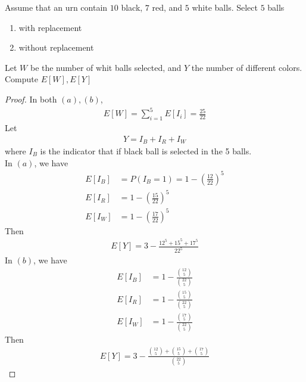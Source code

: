 \documentclass{report}
\begin{document}
\begin{question}{}{}
Assume that an urn contain $10$ black,  $7$ red, and  $5$ white balls. Select  $5$ balls 
 \begin{enumerate}[label=(\alph*)]
  \item with replacement 
  \item without replacement
\end{enumerate}
Let $W$ be the number of whit balls selected, and $Y$ the number of different colors. Compute  $E[W],E[Y]$
\end{question}
\begin{proof}
In both $(a),(b)$, 
\begin{align*}
E[W]=\sum_{i=1}^5 E[I_i]=\frac{25}{22}
\end{align*}
Let 
\begin{align*}
Y=I_B+I_R+I_W
\end{align*}
where $I_B$ is the indicator that if black ball is selected in the 5 balls.\\


In $(a)$, we have 
\begin{align*}
E[I_B]&=P(I_B=1)=1-(\frac{12}{22})^5\\
E[I_R]&=1-(\frac{15}{22})^5\\
E[I_W]&=1-(\frac{17}{22})^5
\end{align*}
Then 
\begin{align*}
E[Y]=3-\frac{12^5+15^5+17^5}{22^5}
\end{align*}
In $(b)$, we have 
\begin{align*}
E[I_B]&=1-\frac{\binom{12}{5}}{\binom{22}{5}}\\
E[I_R]&=1-\frac{\binom{15}{5}}{\binom{22}{5}}\\
E[I_W]&=1-\frac{\binom{17}{5}}{\binom{22}{5}}
\end{align*}
Then 
\begin{align*}
E[Y]=3-\frac{\binom{12}{5}+\binom{15}{5}+\binom{17}{5}}{\binom{22}{5}}
\end{align*}
\end{proof}
\end{document}
